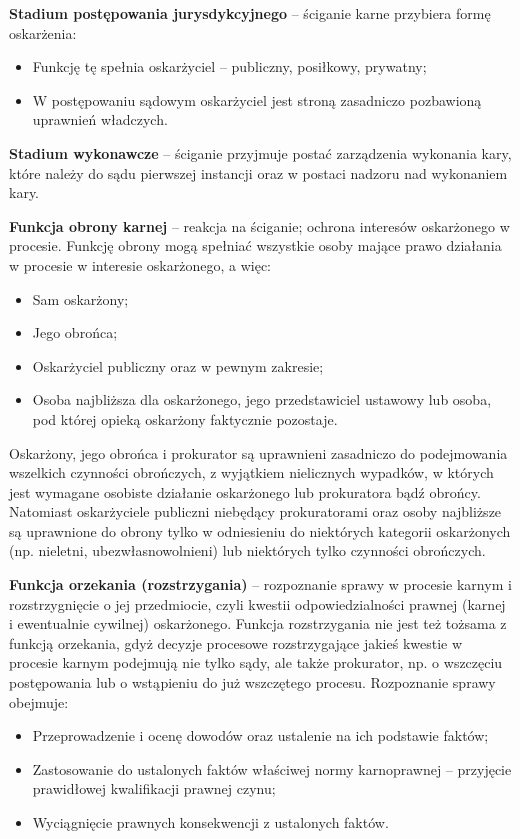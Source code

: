 \textbf{Stadium postępowania jurysdykcyjnego} – ściganie karne przybiera formę oskarżenia:\begin{itemize}
    \item Funkcję tę spełnia oskarżyciel – publiczny, posiłkowy, prywatny;
    \item W postępowaniu sądowym oskarżyciel jest stroną zasadniczo pozbawioną uprawnień władczych.
\end{itemize}

\textbf{Stadium wykonawcze} – ściganie przyjmuje postać zarządzenia wykonania kary, które należy do sądu pierwszej instancji oraz w postaci nadzoru nad wykonaniem kary.\medskip

\textbf{Funkcja obrony karnej} – reakcja na ściganie; ochrona interesów oskarżonego w procesie. Funkcję obrony mogą spełniać wszystkie osoby mające prawo działania w procesie w interesie oskarżonego, a więc:\begin{itemize}
    \item Sam oskarżony;
    \item Jego obrońca;
    \item Oskarżyciel publiczny oraz w pewnym zakresie;
    \item Osoba najbliższa dla oskarżonego, jego przedstawiciel ustawowy lub osoba, pod której opieką oskarżony faktycznie pozostaje.
\end{itemize}

Oskarżony, jego obrońca i prokurator są uprawnieni zasadniczo do podejmowania wszelkich czynności obrończych, z wyjątkiem nielicznych wypadków, w których jest wymagane osobiste działanie oskarżonego lub prokuratora bądź obrońcy. Natomiast oskarżyciele publiczni niebędący prokuratorami oraz osoby najbliższe są uprawnione do obrony tylko w odniesieniu do niektórych kategorii oskarżonych (np. nieletni, ubezwłasnowolnieni) lub niektórych tylko czynności obrończych.\medskip

\textbf{Funkcja orzekania (rozstrzygania)} – rozpoznanie sprawy w procesie karnym i rozstrzygnięcie o jej przedmiocie, czyli kwestii odpowiedzialności prawnej (karnej i ewentualnie cywilnej) oskarżonego. Funkcja rozstrzygania nie jest też tożsama z funkcją orzekania, gdyż decyzje procesowe rozstrzygające jakieś kwestie w procesie karnym podejmują nie tylko sądy, ale także prokurator, np. o wszczęciu postępowania lub o wstąpieniu do już wszczętego procesu. Rozpoznanie sprawy obejmuje:\begin{itemize}
    \item Przeprowadzenie i ocenę dowodów oraz ustalenie na ich podstawie faktów;
    \item Zastosowanie do ustalonych faktów właściwej normy karnoprawnej – przyjęcie prawidłowej kwalifikacji prawnej czynu;
    \item Wyciągnięcie prawnych konsekwencji z ustalonych faktów.
\end{itemize}

